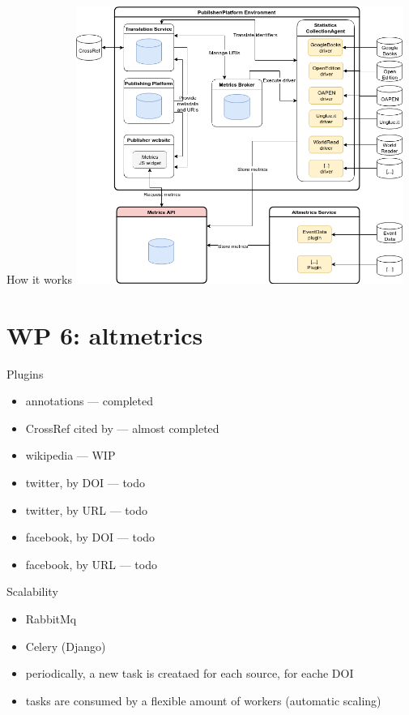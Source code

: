 \documentclass[xcolor=svgnames]{beamer}
\begin{document}
        \begin{frame}{How it works}
            \includegraphics[width=0.8\textwidth]{img/metrics-servicehirmeos-wp6.png}
        \end{frame}

\section{WP 6: altmetrics}

    \begin{frame}{Plugins}
        \begin{itemize}
            \item annotations --- completed
            \item CrossRef cited by --- almost completed
            \item wikipedia --- WIP
            \item twitter, by DOI --- todo
            \item twitter, by URL --- todo
            \item facebook, by DOI --- todo
            \item facebook, by URL --- todo
        \end{itemize}
    \end{frame}

    \begin{frame}{Scalability}
        \begin{itemize}
            \item RabbitMq
            \item Celery (Django)
            \item periodically, a new task is creataed for each source, for eache DOI
            \item tasks are consumed by a flexible amount of workers (automatic scaling)
        \end{itemize}
    \end{frame}
\end{document}
